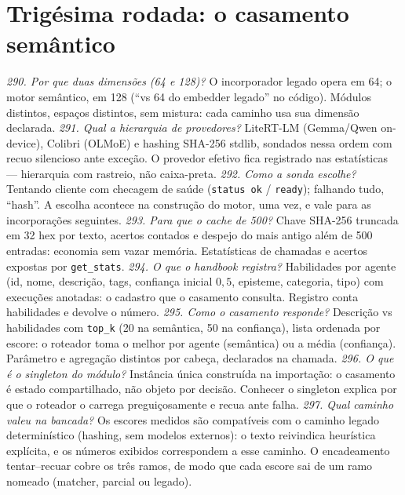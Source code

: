 \section{Trigésima rodada: o casamento semântico}
\textit{290. Por que duas dimensões (64 e 128)?} O incorporador legado opera em 64; o motor semântico, em 128 (``vs 64 do embedder legado'' no código). Módulos distintos, espaços distintos, sem mistura: cada caminho usa sua dimensão declarada.
\textit{291. Qual a hierarquia de provedores?} LiteRT-LM (Gemma/Qwen on-device), Colibri (OLMoE) e hashing SHA-256 stdlib, sondados nessa ordem com recuo silencioso ante exceção. O provedor efetivo fica registrado nas estatísticas --- hierarquia com rastreio, não caixa-preta.
\textit{292. Como a sonda escolhe?} Tentando cliente com checagem de saúde (\texttt{status ok} / \texttt{ready}); falhando tudo, ``hash''. A escolha acontece na construção do motor, uma vez, e vale para as incorporações seguintes.
\textit{293. Para que o cache de 500?} Chave SHA-256 truncada em 32 hex por texto, acertos contados e despejo do mais antigo além de 500 entradas: economia sem vazar memória. Estatísticas de chamadas e acertos expostas por \texttt{get\_stats}.
\textit{294. O que o handbook registra?} Habilidades por agente (id, nome, descrição, tags, confiança inicial $0{,}5$, episteme, categoria, tipo) com execuções anotadas: o cadastro que o casamento consulta. Registro conta habilidades e devolve o número.
\textit{295. Como o casamento responde?} Descrição vs habilidades com \texttt{top\_k} (20 na semântica, 50 na confiança), lista ordenada por escore: o roteador toma o melhor por agente (semântica) ou a média (confiança). Parâmetro e agregação distintos por cabeça, declarados na chamada.
\textit{296. O que é o singleton do módulo?} Instância única construída na importação: o casamento é estado compartilhado, não objeto por decisão. Conhecer o singleton explica por que o roteador o carrega preguiçosamente e recua ante falha.
\textit{297. Qual caminho valeu na bancada?} Os escores medidos são compatíveis com o caminho legado determinístico (hashing, sem modelos externos): o texto reivindica heurística explícita, e os números exibidos correspondem a esse caminho. O encadeamento tentar--recuar cobre os três ramos, de modo que cada escore sai de um ramo nomeado (matcher, parcial ou legado).
